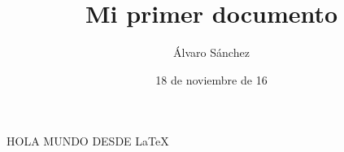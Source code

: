 \documentclass[10pt,a4paper]{article}
\title{Mi primer documento}
\author{Álvaro Sánchez}
\date{18 de noviembre de 16}
\begin{document}
	\maketitle
	HOLA MUNDO DESDE \LaTeX
\end{document}
